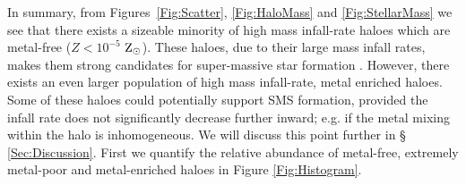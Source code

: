 \documentclass[graphics, twocolumn, usenatbib]{mn2e}
\newcommand{\zsolarc} {$\rm{Z_{\odot}}$}
\begin{document}
In summary, from Figures~\ref{Fig:Scatter}, \ref{Fig:HaloMass}
and \ref{Fig:StellarMass} we see that there exists a sizeable minority of high mass infall-rate haloes
which are metal-free ($Z < 10^{-5}$ \zsolarc). These
haloes, due to their large mass infall rates, makes them strong candidates for super-massive
star formation \citep{Woods_2018, Chon_2020}. However,  there exists an even larger population of
high mass infall-rate, metal enriched haloes. Some of these haloes could potentially support SMS formation,
provided the infall rate does not significantly decrease further inward; 
e.g. if the metal mixing within the halo is inhomogeneous. We will discuss this point further in \S
\ref{Sec:Discussion}. First we quantify the relative abundance of metal-free, extremely metal-poor
and metal-enriched haloes in Figure \ref{Fig:Histogram}.
\end{document}
